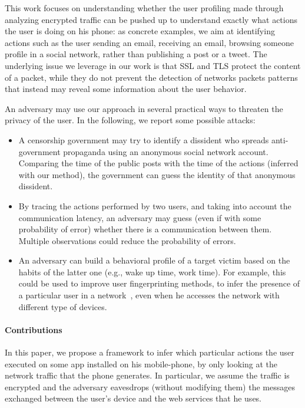 \documentclass{acm_proc_article-sp}
\newcommand{\hilight}[1]{#1}
\begin{document}
This work focuses on understanding whether the user profiling made through analyzing encrypted traffic can be pushed up to understand exactly what actions the user is doing on his phone: as concrete examples, we aim at identifying actions such as the user sending an email, receiving an email, browsing someone profile in a social network, \hilight{rather than publishing a post or a tweet.} The underlying issue we leverage in our work is that SSL and TLS protect the content of a packet, while they do not 
prevent the detection of networks packets patterns that instead may reveal some information about the user behavior.

\hilight{
An adversary may use our approach in several practical ways to threaten the privacy of the user.
In the following, we report some possible attacks:}
\begin{itemize}
\item \hilight{
A censorship government may try to identify a dissident who spreads anti-government propaganda 
using an anonymous social network account. Comparing the time of the public posts with the time of the actions
(inferred with our method), the government can guess the identity of that anonymous dissident.}
\item \hilight{By tracing the actions performed by two users, and taking into account the 
communication latency, an adversary may guess (even if with some probability of error) whether there is a communication 
between them. Multiple observations could reduce the probability of errors.}
\item \hilight{An adversary can build a behavioral profile of a target victim based on the habits of the latter one
(e.g., wake up time, work time).
For example, this could be used to improve user fingerprinting methods, to infer the presence of a 
particular user in a network}~\cite{NinoVerdeNATleftBehind}, \hilight{even when he accesses the network 
with different type of devices.}

\end{itemize}






\paragraph{Contributions}
In this paper, we propose a framework to infer which particular actions the 
user executed on some app installed on his mobile-phone, by only looking 
at the network traffic that the phone generates. In particular, we assume the traffic is encrypted and the adversary eavesdrops (without modifying them) the messages exchanged between the user's device and the web services that he uses. 
\end{document}
